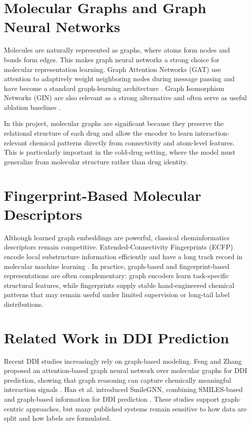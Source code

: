 \documentclass[12pt,a4paper]{report}
\begin{document}
\section{Molecular Graphs and Graph Neural Networks}
Molecules are naturally represented as graphs, where atoms form nodes and bonds form edges. This makes graph neural networks a strong choice for molecular representation learning. Graph Attention Networks (GAT) use attention to adaptively weight neighboring nodes during message passing and have become a standard graph-learning architecture \cite{velickovic2018gat}. Graph Isomorphism Networks (GIN) are also relevant as a strong alternative and often serve as useful ablation baselines \cite{xu2019gin}.

In this project, molecular graphs are significant because they preserve the relational structure of each drug and allow the encoder to learn interaction-relevant chemical patterns directly from connectivity and atom-level features. This is particularly important in the cold-drug setting, where the model must generalize from molecular structure rather than drug identity.

\section{Fingerprint-Based Molecular Descriptors}
Although learned graph embeddings are powerful, classical cheminformatics descriptors remain competitive. Extended-Connectivity Fingerprints (ECFP) encode local substructure information efficiently and have a long track record in molecular machine learning \cite{rogers2010ecfp}. In practice, graph-based and fingerprint-based representations are often complementary: graph encoders learn task-specific structural features, while fingerprints supply stable hand-engineered chemical patterns that may remain useful under limited supervision or long-tail label distributions.

\section{Related Work in DDI Prediction}
Recent DDI studies increasingly rely on graph-based modeling. Feng and Zhang proposed an attention-based graph neural network over molecular graphs for DDI prediction, showing that graph reasoning can capture chemically meaningful interaction signals \cite{feng2022gnnddi}. Han et al. introduced SmileGNN, combining SMILES-based and graph-based information for DDI prediction \cite{han2022smilegnn}. These studies support graph-centric approaches, but many published systems remain sensitive to how data are split and how labels are formulated.
\end{document}
